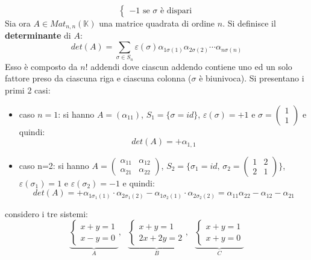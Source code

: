 \documentclass[a4paper,12pt, oneside]{book}
\begin{document}
\begin{shaded}
\begin{definizione}[bonus]
$$\begin{cases}
				-1  \mbox{   se } \sigma \mbox{ è dispari}
			\end{cases}$$
		Sia ora $A\in Mat_{n,n}(\mathbb{K})$ una matrice quadrata di ordine $n$. Si definisce il \textbf{determinante} di $A$:
		$$det(A)=\sum_{\sigma\in S_n} \varepsilon(\sigma)\alpha_{1\sigma(1)}\alpha_{2\sigma(2)}\cdots \alpha_{n\sigma(n)}$$
		Esso è composto da $n!$ addendi dove ciascun addendo contiene uno ed un solo fattore preso da ciascuna riga e ciascuna colonna ($\sigma$ è biunivoca). Si presentano i primi 2 casi:
		\begin{itemize}
			\item caso $n=1$: si hanno $A=(\alpha_{11})$, $S_1=\{\sigma=id\}$, $\varepsilon(\sigma)=+1$ e $
				      \sigma=\left(\begin{matrix}
						      1 \\
						      1
					      \end{matrix}\right)
			      $ e quindi:
			      $$det(A)=+\alpha_{1,1}$$
			\item caso n=2: si hanno $
				      A=\left(\begin{matrix}
						      \alpha_{11} & \alpha_{12} \\
						      \alpha_{21} & \alpha_{22}
					      \end{matrix}\right)
			      $, $S_2=\{\sigma_1=id,\, \sigma_2=\left(\begin{matrix}
						      1 & 2 \\
						      2 & 1
					      \end{matrix}\right)\}$, $\varepsilon(\sigma_1)=1$ e $ \varepsilon(\sigma_2)=-1$ e quindi:
			      $$det(A)=+\alpha_{1\sigma_1(1)}\cdot \alpha_{2\sigma_1(2)}-\alpha_{1\sigma_2(1)}\cdot \alpha_{2\sigma_2(2)}=\alpha_{11}\alpha_{22}-\alpha_{12}-\alpha_{21}$$
		\end{itemize}
	\end{definizione}
\end{shaded}
considero i tre sistemi:
$$
	\underbrace{\begin{cases}
			x+y=1 \\
			x-y=0
		\end{cases}}_{A},\,\,\,\,
	\underbrace{\begin{cases}
			x+y=1 \\
			2x+2y=2
		\end{cases}}_{B},\,\,\,\,
	\underbrace{\begin{cases}
			x+y=1 \\
			x+y=0
		\end{cases}}_{C}
$$
\end{document}
